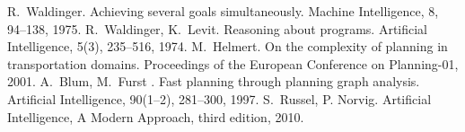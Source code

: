 \documentclass{report}
\begin{document}
\begin{thebibliography}{4}
 R.~Waldinger. Achieving several goals simultaneously. Machine Intelligence, 8,  94--138, 1975. 
 R.~Waldinger, K.~Levit. Reasoning about programs. Artificial Intelligence, 5(3), 235--516, 1974.
M.~Helmert. On the complexity of planning in transportation domains.  Proceedings of the European Conference on Planning-01, 2001.
 A.~Blum, M.~Furst . Fast planning through planning graph analysis. Artificial Intelligence, 90(1--2), 281--300, 1997.
 S.~Russel, P. Norvig. Artificial Intelligence, A Modern Approach, third edition, 2010. 
   \end{thebibliography} 
 
\end{document}
